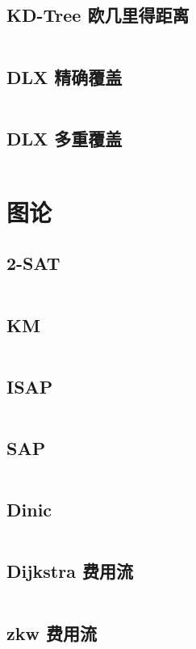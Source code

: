 \documentclass[titlepage,landscape,a4paper,10pt]{article}
\begin{document}
\begin{multicols}{2}
\begin{spacing}{0.8}
\subsection{KD-Tree 欧几里得距离}
\inputminted{cpp}{DataStructure/KDT2.cpp}


\subsection{DLX 精确覆盖}
\inputminted{cpp}{DataStructure/DLX.cpp}

\subsection{DLX 多重覆盖}
\inputminted{cpp}{DataStructure/DLX2.cpp}

\section{图论}

\subsection{2-SAT}
\inputminted{cpp}{Graph/2-SAT.cpp}

\subsection{KM}
\inputminted{cpp}{Graph/KM.cpp}

\subsection{ISAP}
\inputminted{cpp}{Graph/ISAP.cpp}

\subsection{SAP}
\inputminted{cpp}{Graph/SAP.cpp}

\subsection{Dinic}
\inputminted{cpp}{Graph/dinic.cpp}

\subsection{Dijkstra 费用流}
\inputminted{cpp}{Graph/MinCostFlow.cpp}

\subsection{zkw 费用流}
\inputminted{cpp}{Graph/zkw费用流.cpp}


\end{spacing}
\end{multicols}
\end{document}

